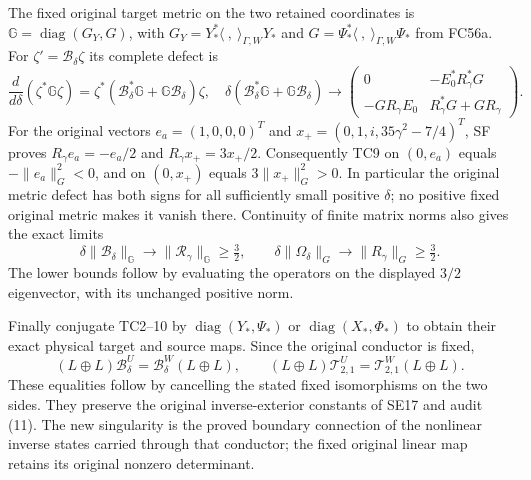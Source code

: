 The fixed original target metric on the two retained coordinates is
$\mathbb G=\operatorname{diag}(G_Y,G)$, with
$G_Y=Y_*^*\langle\ ,\ \rangle_{\Gamma,W}Y_*$ and
$G=\Psi_*^*\langle\ ,\ \rangle_{\Gamma,W}\Psi_*$ from FC56a.
For $\zeta'=\mathcal B_\delta\zeta$ its complete defect is
\[
 \frac{d}{d\delta}(\zeta^*\mathbb G\zeta)
 =\zeta^*(\mathcal B_\delta^*\mathbb G+
                              \mathbb G\mathcal B_\delta)\zeta,
 \quad
 \delta(\mathcal B_\delta^*\mathbb G+
                 \mathbb G\mathcal B_\delta)
 \longrightarrow
 \begin{pmatrix}
 0&-E_0^*R_\gamma^*G\\-GR_\gamma E_0&R_\gamma^*G+GR_\gamma
 \end{pmatrix}. \tag{TC9}
\]
For the original vectors $e_a=(1,0,0,0)^T$ and
$x_+=(0,1,i,35\gamma^2-7/4)^T$, SF proves
$R_\gamma e_a=-e_a/2$ and $R_\gamma x_+=3x_+/2$.
Consequently TC9 on $(0,e_a)$ equals $-\|e_a\|_G^2<0$, and
on $(0,x_+)$ equals $3\|x_+\|_G^2>0$. In particular the original
metric defect has both signs for all sufficiently small positive
$\delta$; no positive fixed original metric makes it vanish there.
Continuity of finite matrix norms also gives the exact limits
\[
 \delta\|\mathcal B_\delta\|_{\mathbb G}
       \longrightarrow\|\mathcal R_\gamma\|_{\mathbb G}\ge\tfrac32,
 \qquad
 \delta\|\Omega_\delta\|_G\longrightarrow\|R_\gamma\|_G
       \ge\tfrac32. \tag{TC10}
\]
The lower bounds follow by evaluating the operators on the displayed
$3/2$ eigenvector, with its unchanged positive norm.

Finally conjugate TC2--10 by
$\operatorname{diag}(Y_*,\Psi_*)$ or
$\operatorname{diag}(X_*,\Phi_*)$ to obtain their exact physical
target and source maps. Since the original conductor is fixed,
\[
 (L\oplus L)\mathcal B^U_\delta
      =\mathcal B^W_\delta(L\oplus L),\qquad
 (L\oplus L)\mathcal T^U_{2,1}
      =\mathcal T^W_{2,1}(L\oplus L). \tag{TC11}
\]
These equalities follow by cancelling the stated fixed isomorphisms
on the two sides. They preserve the original inverse-exterior
constants of SE17 and audit (11). The new singularity is the proved
boundary connection of the nonlinear inverse states carried through
that conductor; the fixed original linear map retains its original
nonzero determinant.


